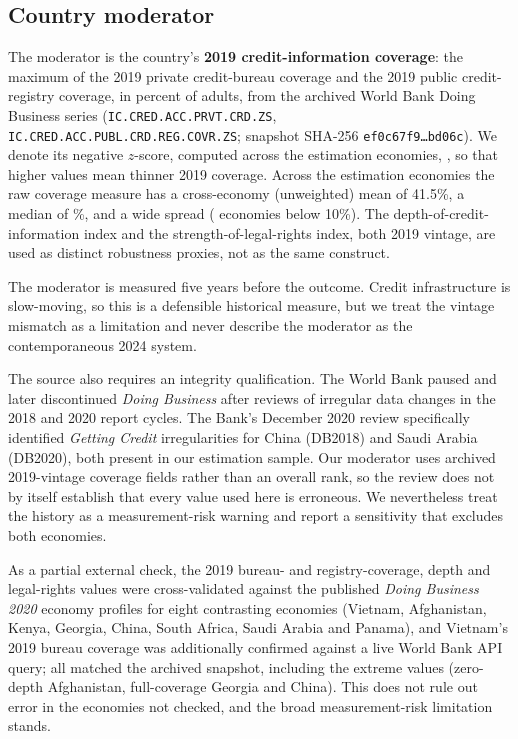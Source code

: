 \subsection{Country moderator}

The moderator is the country's \textbf{2019 credit-information coverage}: the maximum of the
2019 private credit-bureau coverage and the 2019 public credit-registry coverage, in percent
of adults, from the archived World Bank Doing Business series
(\texttt{IC.CRED.ACC.PRVT.CRD.ZS}, \texttt{IC.CRED.ACC.PUBL.CRD.REG.COVR.ZS}; snapshot
SHA-256 \texttt{ef0c67f9\ldots bd06c}). We denote its negative $z$-score, computed across
the estimation economies, \lowcovz, so that higher values mean thinner 2019 coverage.
Across the \NEconomies{} estimation economies the raw coverage measure has a cross-economy
(unweighted) mean of 41.5\%, a median of \SampleMedianCoverage\%, and a wide spread
(\ThinCoverageEconomies{} economies below 10\%). The depth-of-credit-information index and
the strength-of-legal-rights index, both 2019 vintage, are used as distinct robustness
proxies, not as the same construct.

The moderator is measured five years before the outcome. Credit infrastructure is
slow-moving, so this is a defensible historical measure, but we treat the vintage mismatch
as a limitation and never describe the moderator as the contemporaneous 2024 system.

The source also requires an integrity qualification. The World Bank paused and later
discontinued \emph{Doing Business} after reviews of irregular data changes in the 2018 and
2020 report cycles. The Bank's December 2020 review specifically identified \emph{Getting
Credit} irregularities for China (DB2018) and Saudi Arabia (DB2020), both present in our
estimation sample. Our moderator uses archived 2019-vintage coverage fields rather than an
overall rank, so the review does not by itself establish that every value used here is
erroneous. We nevertheless treat the history as a measurement-risk warning and report a
sensitivity that excludes both economies.

As a partial external check, the 2019 bureau- and registry-coverage, depth and legal-rights
values were cross-validated against the published \emph{Doing Business 2020} economy
profiles for eight contrasting economies (Vietnam, Afghanistan, Kenya, Georgia, China, South
Africa, Saudi Arabia and Panama), and Vietnam's 2019 bureau coverage was additionally
confirmed against a live World Bank API query; all matched the archived snapshot, including
the extreme values (zero-depth Afghanistan, full-coverage Georgia and China). This does not
rule out error in the economies not checked, and the broad measurement-risk limitation
stands.

